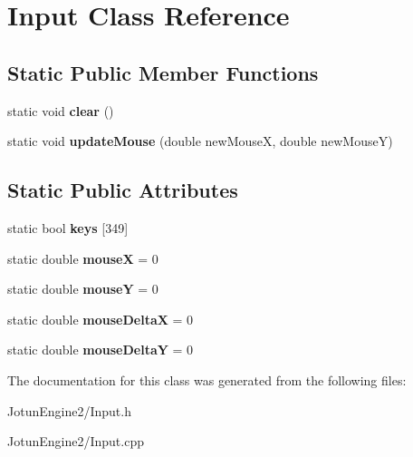 \hypertarget{class_input}{\section{Input Class Reference}
\label{class_input}
}
\subsection*{Static Public Member Functions}
\begin{DoxyCompactItemize}
\item 
\hypertarget{class_input_a137d26e571405f42b63c955958fd7c92}{static void {\bfseries clear} ()}\label{class_input_a137d26e571405f42b63c955958fd7c92}

\item 
\hypertarget{class_input_af6bcab8c1b438b9148381e50ef60e924}{static void {\bfseries update\-Mouse} (double new\-Mouse\-X, double new\-Mouse\-Y)}\label{class_input_af6bcab8c1b438b9148381e50ef60e924}

\end{DoxyCompactItemize}
\subsection*{Static Public Attributes}
\begin{DoxyCompactItemize}
\item 
\hypertarget{class_input_ae8198f96ea40f91fe9b910133a877959}{static bool {\bfseries keys} \mbox{[}349\mbox{]}}\label{class_input_ae8198f96ea40f91fe9b910133a877959}

\item 
\hypertarget{class_input_ac037722a59886e511544f858a0b7b4ed}{static double {\bfseries mouse\-X} = 0}\label{class_input_ac037722a59886e511544f858a0b7b4ed}

\item 
\hypertarget{class_input_afc8b383eee676dc3fa03a0f93e4ec106}{static double {\bfseries mouse\-Y} = 0}\label{class_input_afc8b383eee676dc3fa03a0f93e4ec106}

\item 
\hypertarget{class_input_acfbd3db4dd89f2e58b1ee8bc793b69d5}{static double {\bfseries mouse\-Delta\-X} = 0}\label{class_input_acfbd3db4dd89f2e58b1ee8bc793b69d5}

\item 
\hypertarget{class_input_a17cf4626f1454c1ef6d8468983a2188d}{static double {\bfseries mouse\-Delta\-Y} = 0}\label{class_input_a17cf4626f1454c1ef6d8468983a2188d}

\end{DoxyCompactItemize}


The documentation for this class was generated from the following files\-:\begin{DoxyCompactItemize}
\item 
Jotun\-Engine2/Input.\-h\item 
Jotun\-Engine2/Input.\-cpp\end{DoxyCompactItemize}
